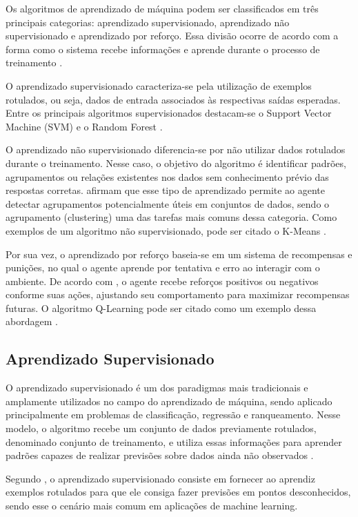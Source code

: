 \documentclass[
    12pt,                %
    openright,           %
    oneside,             %
    a4paper,             %
    english,             %
    brazil               %
]{abntex2}
\begin{document}
Os algoritmos de aprendizado de máquina podem ser classificados em três principais categorias: aprendizado supervisionado, aprendizado não supervisionado e aprendizado por reforço. Essa divisão ocorre de acordo com a forma como o sistema recebe informações e aprende durante o processo de treinamento \cite{Gopalakrishnan2023}.


O aprendizado supervisionado caracteriza-se pela utilização de exemplos rotulados, ou seja, dados de entrada associados às respectivas saídas esperadas. Entre os principais algoritmos supervisionados destacam-se o Support Vector Machine (SVM) e o Random Forest \cite{Russell2010, Gopalakrishnan2023}. 


O aprendizado não supervisionado diferencia-se por não utilizar dados rotulados durante o treinamento. Nesse caso, o objetivo do algoritmo é identificar padrões, agrupamentos ou relações existentes nos dados sem conhecimento prévio das respostas corretas.  afirmam que esse tipo de aprendizado permite ao agente detectar agrupamentos potencialmente úteis em conjuntos de dados, sendo o agrupamento (clustering) uma das tarefas mais comuns dessa categoria. Como exemplos de um algoritmo não supervisionado, pode ser citado o K-Means \cite{Gopalakrishnan2023}.


Por sua vez, o aprendizado por reforço baseia-se em um sistema de recompensas e punições, no qual o agente aprende por tentativa e erro ao interagir com o ambiente. De acordo com , o agente recebe reforços positivos ou negativos conforme suas ações, ajustando seu comportamento para maximizar recompensas futuras. O algoritmo Q-Learning pode ser citado como um exemplo dessa abordagem \cite{Russell2010}.

\subsection{Aprendizado Supervisionado}
O aprendizado supervisionado é um dos paradigmas mais tradicionais e amplamente utilizados no campo do aprendizado de máquina, sendo aplicado principalmente em problemas de classificação, regressão e ranqueamento. Nesse modelo, o algoritmo recebe um conjunto de dados previamente rotulados, denominado conjunto de treinamento, e utiliza essas informações para aprender padrões capazes de realizar previsões sobre dados ainda não observados \cite{Mohri2018}.


Segundo , o aprendizado supervisionado consiste em fornecer ao aprendiz exemplos rotulados para que ele consiga fazer previsões em pontos desconhecidos, sendo esse o cenário mais comum em aplicações de machine learning.
\end{document}
